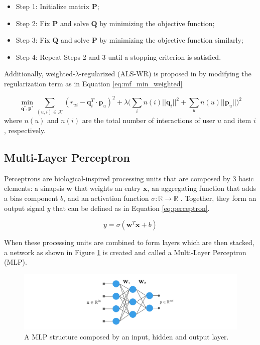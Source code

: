     \begin{itemize}
        \item Step 1: Initialize matrix $\mathbf{P}$;
        \item Step 2: Fix $\mathbf{P}$ and solve $\mathbf{Q}$ by minimizing the objective function;
        \item Step 3: Fix $\mathbf{Q}$ and solve $\mathbf{P}$ by minimizing the objective function similarly;
        \item Step 4: Repeat Steps 2 and 3 until a stopping criterion is satisfied.
    \end{itemize}
    
    Additionally, weighted-$\lambda$-regularized (ALS-WR) is proposed in \cite{2008ALSWR} by modifying the regularization term as in Equation \ref{eq:mf_min_weighted}
    
    \begin{equation}
        \label{eq:mf_min_weighted}
        \min_{\mathbf{q}^*, \mathbf{p}^*} \sum_{(u,i) \in \mathcal{K}} (r_{ui} - \mathbf{q}^T_i \cdot \mathbf{p}_u)^2 + \lambda \Big(\sum_i n(i)||\mathbf{q}_i||^2 + \sum_u n(u)||\mathbf{p}_u||\Big)^2
    \end{equation} where $n(u)$ and $n(i)$ are the total number of interactions of user $u$ and item $i$, respectively.

\subsection{Multi-Layer Perceptron}

     Perceptrons are biological-inspired processing units that are composed by 3 basic elements: a sinapsis $\mathbf{w}$ that weights an entry $\mathbf{x}$, an aggregating function that adds a bias component $b$, and an activation function $\sigma: \mathbb{R} \rightarrow \mathbb{R}$ \cite{Rosenblatt58theperceptron}. Together, they form an output signal $y$ that can be defined as in Equation \ref{eq:perceptron}.
     
     \begin{equation}
        y = \sigma (\mathbf{w}^T \mathbf{x} + b)
         \label{eq:perceptron}
     \end{equation}
     
    When these processing units are combined to form layers which are then stacked, a network as shown in Figure \ref{fig:mlp} is created and called a Multi-Layer Perceptron (MLP). 
    
    \begin{figure}[ht]
        \centering
        \includegraphics[width=\textwidth]{figs/mlp.png}
        \caption{A MLP structure composed by an input, hidden and output layer.}
        \label{fig:mlp}
    \end{figure}
    

